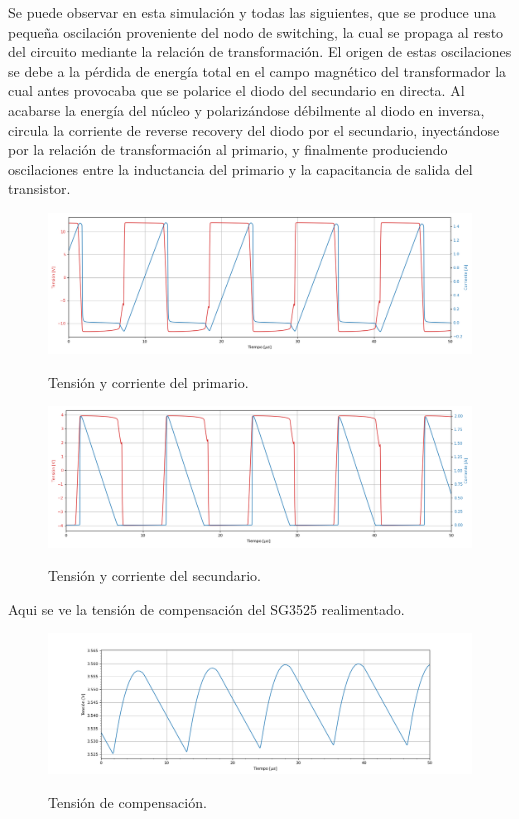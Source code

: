 Se puede observar en esta simulación y todas las siguientes, que se produce una pequeña oscilación proveniente del nodo de switching, la cual se propaga al resto del circuito mediante la relación de transformación. El origen de estas oscilaciones se debe a la pérdida de energía total en el campo magnético del transformador la cual antes provocaba que se polarice el diodo del secundario en directa. Al acabarse la energía del núcleo y polarizándose débilmente al diodo en inversa, circula la corriente de reverse recovery del diodo por el secundario, inyectándose por la relación de transformación al primario, y finalmente produciendo oscilaciones entre la inductancia del primario y la capacitancia de salida del transistor.

\begin{figure}[H]
	\centering
	\includegraphics[width=0.9\linewidth]{ImagenesParteIII/Primario.png}
	\label{fig:primario}
	\caption{Tensión y corriente del primario.}
\end{figure}

\begin{figure}[H]
	\centering
	\includegraphics[width=0.9\linewidth]{ImagenesParteIII/Secundario.png}
	\label{fig:secundario}
	\caption{Tensión y corriente del secundario.}
\end{figure}
Aqui se ve la tensión de compensación del SG3525 realimentado.
\begin{figure}[H]
	\centering
	\includegraphics[width=0.9\linewidth]{ImagenesParteIII/Vcom.png}
	\label{fig:secundario}
	\caption{Tensión de compensación.}
\end{figure}

